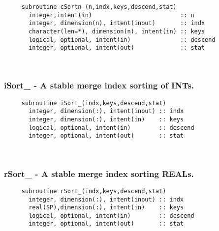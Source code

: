 \begin{verbatim} 
     subroutine cSortn_(n,indx,keys,descend,stat)
       integer,intent(in)                         :: n
       integer, dimension(n), intent(inout)       :: indx
       character(len=*), dimension(n), intent(in) :: keys
       logical, optional, intent(in)              :: descend
       integer, optional, intent(out)             :: stat
 \end{verbatim}%
 
 
\mbox{}\hrulefill\ 
 

  \subsubsection{iSort\_ - A stable merge index sorting of INTs.}

\begin{verbatim} 
     subroutine iSort_(indx,keys,descend,stat)
       integer, dimension(:), intent(inout) :: indx
       integer, dimension(:), intent(in)    :: keys
       logical, optional, intent(in)        :: descend
       integer, optional, intent(out)       :: stat
 \end{verbatim}%
 
 
\mbox{}\hrulefill\ 
 

  \subsubsection{rSort\_ - A stable merge index sorting REALs.}

\begin{verbatim} 
     subroutine rSort_(indx,keys,descend,stat)
       integer, dimension(:), intent(inout) :: indx
       real(SP),dimension(:), intent(in)    :: keys
       logical, optional, intent(in)        :: descend
       integer, optional, intent(out)       :: stat
 \end{verbatim}%
 
